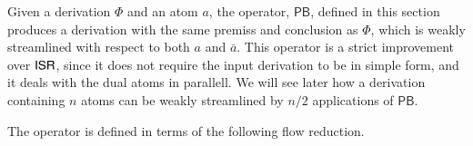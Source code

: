 \newcommand{\PB}{\mathsf{PB}}


Given a derivation $\Phi$ and an atom $a$, the operator, $\PB$, defined in this section produces a derivation with the same premiss and conclusion as $\Phi$, which is weakly streamlined with respect to both $a$ and $\bar a$. This operator is a strict improvement over $\mathsf{ISR}$, since it does not require the input derivation to be in simple form, and it deals with the dual atoms in parallell. We will see later how a derivation containing $n$ atoms can be weakly streamlined by $n/2$ applications of $\PB$.

The operator is defined in terms of the following flow reduction.

\newcommand{\frpb}{{\mathsf{pb}}}
